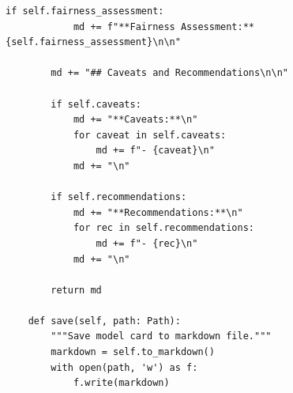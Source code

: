 \begin{lstlisting}[style=python, caption=Automated model card generation]
        if self.fairness_assessment:
            md += f"**Fairness Assessment:** {self.fairness_assessment}\n\n"

        md += "## Caveats and Recommendations\n\n"

        if self.caveats:
            md += "**Caveats:**\n"
            for caveat in self.caveats:
                md += f"- {caveat}\n"
            md += "\n"

        if self.recommendations:
            md += "**Recommendations:**\n"
            for rec in self.recommendations:
                md += f"- {rec}\n"
            md += "\n"

        return md

    def save(self, path: Path):
        """Save model card to markdown file."""
        markdown = self.to_markdown()
        with open(path, 'w') as f:
            f.write(markdown)



\end{lstlisting}

